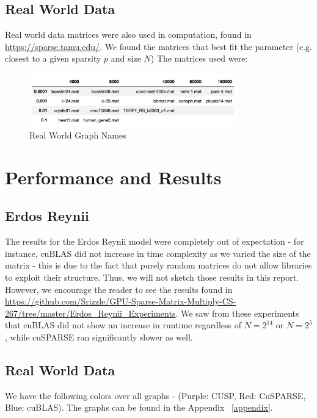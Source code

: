\documentclass[12pt]{article}
\begin{document}
\subsection{Real World Data}
Real world data matrices were also used in computation, found in \url{https://sparse.tamu.edu/}. We found the matrices that best fit the parameter (e.g. closest to a given sparsity $p$ and size $N$) The matrices used were: 
\begin{figure}[h]
  \caption{Real World Graph Names}
  \centering 
  \includegraphics[width = 0.8\textwidth]{matrix_names.png}
\end{figure}

\newpage 

\section{Performance and Results}


\subsection{Erdos Reynii}
The results for the Erdos Reynii model were completely out of expectation - for instance, cuBLAS did not increase in time complexity as we varied the size of the matrix - this is due to the fact that purely random matrices do not allow libraries to exploit their structure. Thus, we will not sketch those results in this report. However, we encourage the reader to see the results found in \url{https://github.com/Srizzle/GPU-Sparse-Matrix-Multiply-CS-267/tree/master/Erdos_Reynii_Experiments}. We saw from these experiments that cuBLAS did not show an increase in runtime regardless of $N = 2^{14}$ or $N = 2^{5}$, while cuSPARSE ran significantly slower as well. 

\subsection{Real World Data}
We have the following colors over all graphs -  
(Purple: CUSP, Red: CuSPARSE, Blue: cuBLAS). The graphs can be found in the Appendix ~\ref{appendix}.
\end{document}
